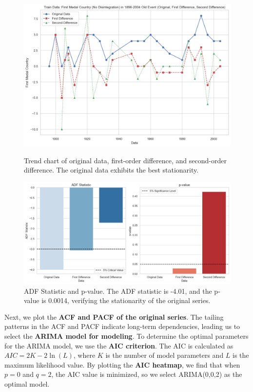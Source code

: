 \documentclass{mcmthesis}  %
\begin{document}
\begin{figure}[ht]
  \centering
  \begin{minipage}[b]{0.42\textwidth}
    \includegraphics[width=\textwidth]{first_medal/1}
    \caption{Trend chart of original data, first-order difference, and second-order difference. The original data exhibits the best stationarity.}
    \label{fig:image-a}
  \end{minipage}
  \hfill
  \begin{minipage}[b]{0.42\textwidth}
    \includegraphics[width=\textwidth]{first_medal/2}
    \caption{ADF Statistic and p-value. The ADF statistic is -4.01, and the p-value is 0.0014, verifying the stationarity of the original series.}
    \label{fig:image-b}
  \end{minipage}
  \label{fig:images}
\end{figure}

Next, we plot the \textbf{ACF and PACF of the original series}. The tailing patterns in the ACF and PACF indicate long-term dependencies, leading us to select the \textbf{ARIMA model for modeling}. To determine the optimal parameters for the ARIMA model, we use the \textbf{AIC criterion}. The AIC is calculated as $AIC = 2K - 2\ln(L)$, where $K$ is the number of model parameters and $L$ is the maximum likelihood value. By plotting the \textbf{AIC heatmap}, we find that when $p = 0$ and $q = 2$, the AIC value is minimized, so we select ARIMA(0,0,2) as the optimal model.
\end{document}
